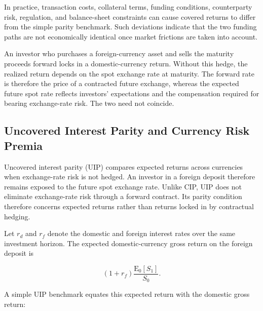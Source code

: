 In practice, transaction costs, collateral terms, funding conditions, counterparty risk, regulation, and balance-sheet constraints can cause covered returns to differ from the simple parity benchmark. Such deviations indicate that the two funding paths are not economically identical once market frictions are taken into account.

\begin{tcolorbox}[
  enhanced,
  breakable,
  colback=white,
  colframe=FinanceBlue,
  boxrule=0.7pt,
  sharp corners,
  borderline west={2.2pt}{0pt}{FinanceBlue},
  title=\textbf{Financial Perspective: A Forward Rate Is Not a Forecast},
  coltitle=white,
  colbacktitle=FinanceBlue,
  fonttitle=\bfseries,
  before skip=1.2em,
  after skip=1.2em
]

An investor who purchases a foreign-currency asset
and sells the maturity proceeds forward locks in
a domestic-currency return. Without this hedge, the
realized return depends on the spot exchange rate
at maturity. The forward rate is therefore the price
of a contracted future exchange, whereas the expected
future spot rate reflects investors' expectations
and the compensation required for bearing exchange-rate
risk. The two need not coincide.

\end{tcolorbox}


\subsection{Uncovered Interest Parity and Currency Risk Premia}

Uncovered interest parity (UIP) compares expected
returns across currencies when exchange-rate risk
is not hedged. An investor in a foreign deposit
therefore remains exposed to the future spot
exchange rate. Unlike CIP, UIP does not eliminate
exchange-rate risk through a forward contract.
Its parity condition therefore concerns expected
returns rather than returns locked in by contractual
hedging.

Let $r_d$ and $r_f$ denote the domestic and foreign
interest rates over the same investment horizon.
The expected domestic-currency gross return on the
foreign deposit is

\begin{equation*}
(1+r_f)\frac{\mathrm{E}_0[S_1]}{S_0}.
\label{eq:ch10-uip-foreign-return}
\end{equation*}

A simple UIP benchmark equates this expected return
with the domestic gross return:

